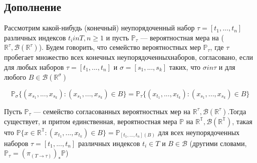 \subsection{Дополнение}
\begin{definition}
Рассмотрим какой-нибудь (конечный) неупорядоченный набор $\tau = [t_1, ..., t_n]$ различных индексов $t_i in T, n \geq 1$ и пусть $\mathbb{P_{\tau}}$ — вероятностная мера на ($\mathbb{R^{\tau}}, \mathscr{B}(\mathbb{R^{\tau}}) $).  Будем говорить, что семейство вероятностных мер {$\mathbb{P_{\tau}}$}, где $\tau$ пробегает множество всех конечных неупорядоченныхнаборов, согласовано, если для любых наборов  $\tau = [t_1, ..., t_n]$ и $\sigma =[s_1, ..., s_k]$  таких, что $\sigma in \tau$ и для любого $B \in  \mathscr{B}(\mathbb{R^{\sigma}})$

 \begin{equation} \label{trivial}
\mathbb{P_{\sigma}}\{(x_{s_1}, ..., x_{s_k}):(x_{s_1}, ..., x_{s_k}) \in B\} = \mathbb{P_{\tau}}\{(x_{t_1}, ..., x_{t_k}):(x_{s_1}, ..., x_{s_k}) \in B\}
\end{equation}
\end{definition}


\begin{theorem}
Пусть  $\mathbb{P_{\tau}}$ — семейство согласованных вероятностных мер на $\mathbb{R^{\tau}}, \mathscr{B}(\mathbb{R^{\tau}}) $.Тогда существует, и притом единственная, вероятностная мера $\mathbb{P}$ на $\mathbb{R^{T}}, \mathscr{B}(\mathbb{R^{T}}) $, такая что $\mathbb{P}\{x \in \mathbb{R^{T}} : (x_{t_1}, ..., x_{t_k}) \in B\}  = \mathbb{P}_{[t_1, ..., t_n](B)}$ для
всех неупорядоченных наборов $\tau = [t_1, ..., t_n]$ различных индексов $t_i \in T$ и $B \in  \mathscr{B}$ (другими словами,$ \mathbb{P_{\tau}} = (\pi_{(T\rightarrow \tau)})_{*}\mathbb{P}$)
\end{theorem}

